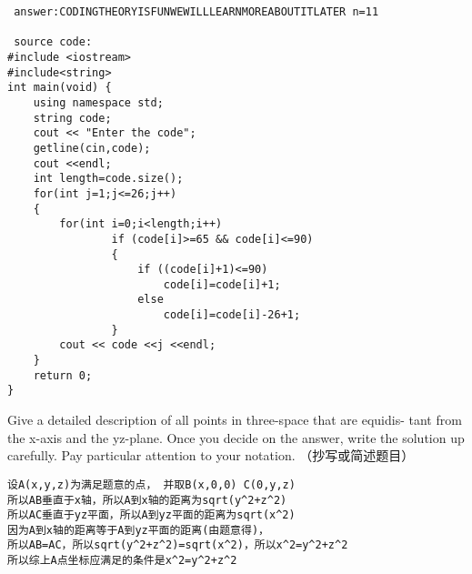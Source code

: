 \documentclass[11pt, a4paper, UTF8]{ctexart}
\begin{document}
\begin{remark}	%
\end{remark}

\begin{solution}
 \begin{verbatim}  
 answer:CODINGTHEORYISFUNWEWILLLEARNMOREABOUTITLATER n=11
  
 source code:
#include <iostream>
#include<string>
int main(void) {
    using namespace std;
    string code;
    cout << "Enter the code";
    getline(cin,code);
    cout <<endl;
    int length=code.size();
    for(int j=1;j<=26;j++)
    {
        for(int i=0;i<length;i++)
                if (code[i]>=65 && code[i]<=90)
                {
                    if ((code[i]+1)<=90)
                        code[i]=code[i]+1;
                    else
                        code[i]=code[i]-26+1;
                }
        cout << code <<j <<endl;
    }
    return 0;
}

  \end{verbatim} 
 \end{solution}

\begin{problem}[UD: 1.7]	%
  Give a detailed description of all points in three-space that are equidis- tant from the x-axis and the yz-plane. Once you decide on the answer, write the solution up carefully. Pay particular attention to your notation. （抄写或简述题目）
\end{problem}

\begin{remark}	%
  
\end{remark}

\begin{solution}
 \begin{verbatim}  
设A(x,y,z)为满足题意的点， 并取B(x,0,0) C(0,y,z)
所以AB垂直于x轴，所以A到x轴的距离为sqrt(y^2+z^2)
所以AC垂直于yz平面，所以A到yz平面的距离为sqrt(x^2)
因为A到x轴的距离等于A到yz平面的距离(由题意得)，
所以AB=AC，所以sqrt(y^2+z^2)=sqrt(x^2)，所以x^2=y^2+z^2
所以综上A点坐标应满足的条件是x^2=y^2+z^2
  \end{verbatim} 
 \end{solution}
\end{document}

